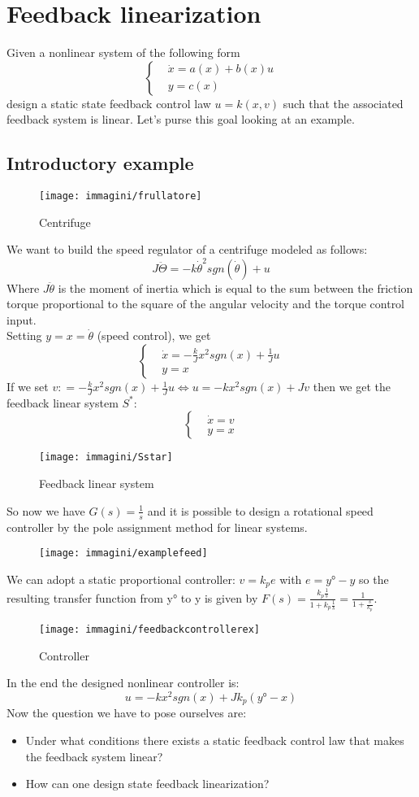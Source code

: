 \chapter{Feedback linearization}
Given a nonlinear system of the following form
\[
\begin{cases}
	&\dot{x}=a(x)+b(x)u\\
	&y=c(x)
\end{cases}
\]
design a static state feedback control law $u=k(x,v)$ such that the associated feedback system is linear. Let's purse this goal looking at an example.
\section{Introductory example}
\begin{figure}[H]
	\centering
	\texttt{[image: immagini/frullatore]}
	\caption{Centrifuge}
	\label{fig:frullatore}
\end{figure}
	We want to build the speed regulator of a centrifuge modeled as follows:\[J\ddot{\Theta}=-k\dot{\theta}^2sgn(\dot{\theta})+u\]
	Where $J\ddot{\theta}$ is the moment of inertia which is equal to the sum between the friction torque proportional to the square of the angular velocity and the torque control input.\\
	Setting $y=x=\dot{\theta}$ (speed control), we get 
	\[\begin{cases}
		&\dot{x}=-\frac{k}{J}x^2sgn(x)+\frac{1}{J}u\\
		&y=x
	\end{cases}
\]
If we set $v\colon =-\frac{k}{J}x^2sgn(x)+\frac{1}{J}u \Leftrightarrow u=-kx^2sgn(x)+Jv$ then we get the feedback linear system $S^*$: \[\begin{cases}
	&	\dot{x}=v\\&y=x
\end{cases}\]\begin{figure}[H]
\centering
\texttt{[image: immagini/Sstar]}
\caption{Feedback linear system}
\label{fig:s}
\end{figure}
So now we have $G(s)=\frac{1}{s}$ and it is possible to design a rotational speed controller by the pole assignment method for linear systems.\begin{figure}[H]
	\centering
	\texttt{[image: immagini/examplefeed]}
	\label{fig:examplefeed}
\end{figure}
We can adopt a static proportional controller: $v=k_pe$ with $e=y°-y$ so the resulting transfer function from y° to y is given by $F(s)=\frac{k_p\frac{1}{s}}{1+k_p\frac{1}{s}}=\frac{1}{1+\frac{s}{k_p}}$.
\begin{figure}[H]
	\centering
	\texttt{[image: immagini/feedbackcontrollerex]}
	\caption{Controller}
	\label{fig:feedbackcontrollerex}
\end{figure}
In the end the designed nonlinear controller is: \[
u=-kx^2sgn(x)+Jk_p(y°-x)
\]
Now the question we have to pose ourselves are:
\begin{itemize}
	\item Under what conditions there exists a static feedback control law that makes the feedback system linear?
	\item How can one design state feedback linearization?
\end{itemize}
